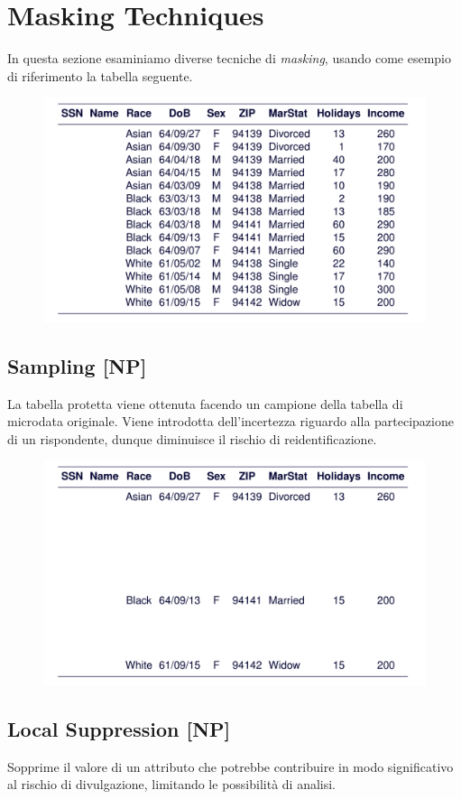 \documentclass{report}
\begin{document}
\section{Masking Techniques}
In questa sezione esaminiamo diverse tecniche di \textit{masking}, usando
come esempio di riferimento la tabella seguente.
\begin{figure}[ht]
    \centering
    \includegraphics[width=1\linewidth]{images/base-ex.png}
\end{figure}

\subsection{Sampling [NP]}
La tabella protetta viene ottenuta facendo un campione della tabella di microdata 
originale. Viene introdotta dell'incertezza riguardo alla partecipazione di un 
rispondente, dunque diminuisce il rischio di reidentificazione.

\begin{figure}[ht]
    \centering
    \includegraphics[width=0.75\linewidth]{images/sampling.png}
\end{figure}

\subsection{Local Suppression [NP]}
Sopprime il valore di un attributo che potrebbe contribuire in modo 
significativo al rischio di divulgazione, limitando le possibilità
di analisi.
\end{document}

